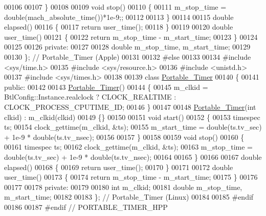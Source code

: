 \begin{DoxyCode}
00106 
00107   \}
00108 
00109   \textcolor{keywordtype}{void} stop()
00110   \{
00111     m\_stop\_time = double(mach\_absolute\_time())*1e-9;;
00112 
00113   \}
00114 
00115   \textcolor{keywordtype}{double} elapsed()
00116   \{
00117     \textcolor{keywordflow}{return}  user\_time();
00118   \}
00119 
00120   \textcolor{keywordtype}{double} user\_time()
00121   \{
00122     \textcolor{keywordflow}{return} m\_stop\_time - m\_start\_time;
00123   \}
00124 
00125 
00126 \textcolor{keyword}{private}:
00127 
00128   \textcolor{keywordtype}{double} m\_stop\_time, m\_start\_time;
00129 
00130 \}; \textcolor{comment}{// Portable\_Timer (Apple)}
00131 
00132 \textcolor{preprocessor}{#else}
00133 
00134 \textcolor{preprocessor}{#include <sys/time.h>}
00135 \textcolor{preprocessor}{#include <sys/resource.h>}
00136 \textcolor{preprocessor}{#include <unistd.h>}
00137 \textcolor{preprocessor}{#include <sys/times.h>}
00138 
00139 \textcolor{keyword}{class }\hyperlink{class_portable___timer}{Portable\_Timer}
00140 \{
00141  \textcolor{keyword}{public}:
00142 
00143   \hyperlink{class_portable___timer}{Portable\_Timer}()
00144   \{
00145     m\_clkid = BtlConfig::Instance.realclock ? CLOCK\_REALTIME : CLOCK\_PROCESS\_CPUTIME\_ID;
00146   \}
00147 
00148   \hyperlink{class_portable___timer}{Portable\_Timer}(\textcolor{keywordtype}{int} clkid) : m\_clkid(clkid)
00149   \{\}
00150 
00151   \textcolor{keywordtype}{void} start()
00152   \{
00153     timespec ts;
00154     clock\_gettime(m\_clkid, &ts);
00155     m\_start\_time = double(ts.tv\_sec) + 1e-9 * double(ts.tv\_nsec);
00156 
00157   \}
00158 
00159   \textcolor{keywordtype}{void} stop()
00160   \{
00161     timespec ts;
00162     clock\_gettime(m\_clkid, &ts);
00163     m\_stop\_time = double(ts.tv\_sec) + 1e-9 * double(ts.tv\_nsec);
00164 
00165   \}
00166 
00167   \textcolor{keywordtype}{double} elapsed()
00168   \{
00169     \textcolor{keywordflow}{return}  user\_time();
00170   \}
00171 
00172   \textcolor{keywordtype}{double} user\_time()
00173   \{
00174     \textcolor{keywordflow}{return} m\_stop\_time - m\_start\_time;
00175   \}
00176 
00177 
00178 \textcolor{keyword}{private}:
00179 
00180   \textcolor{keywordtype}{int} m\_clkid;
00181   \textcolor{keywordtype}{double} m\_stop\_time, m\_start\_time;
00182 
00183 \}; \textcolor{comment}{// Portable\_Timer (Linux)}
00184 
00185 \textcolor{preprocessor}{#endif}
00186 
00187 \textcolor{preprocessor}{#endif  // PORTABLE\_TIMER\_HPP}
\end{DoxyCode}
